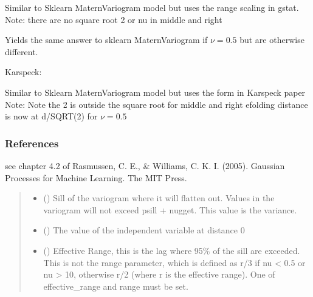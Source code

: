 \documentclass[letterpaper,10pt,english]{sphinxmanual}
\begin{document}
\begin{fulllineitems}
\sphinxAtStartPar
Similar to Sklearn MaternVariogram model but uses the range scaling in
gstat.
Note: there are no square root 2 or nu in middle and right

\sphinxAtStartPar
Yields the same answer to sklearn MaternVariogram if \(\nu=0.5\)
but are otherwise different.

\sphinxAtStartPar
Karspeck:

\sphinxAtStartPar
Similar to Sklearn MaternVariogram model but uses the form in Karspeck paper
Note: Note the 2 is outside the square root for middle and right
e\sphinxhyphen{}folding distance is now at d/SQRT(2) for \(\nu=0.5\)
\subsubsection*{References}

\sphinxAtStartPar
see chapter 4.2 of Rasmussen, C. E., \& Williams, C. K. I. (2005).
Gaussian Processes for Machine Learning. The MIT Press.
\begin{quote}\begin{description}
\begin{itemize}
\item {}
\sphinxAtStartPar
{} (\sphinxstyleliteralemphasis{\sphinxupquote{ | }}) \textendash{} Sill of the variogram where it will flatten out. Values in the variogram
will not exceed psill + nugget. This value is the variance.

\item {}
\sphinxAtStartPar
{} (\sphinxstyleliteralemphasis{\sphinxupquote{ | }}) \textendash{} The value of the independent variable at distance 0

\item {}
\sphinxAtStartPar
{} (\sphinxstyleliteralemphasis{\sphinxupquote{ | }}\sphinxstyleliteralemphasis{\sphinxupquote{ | }}) \textendash{} Effective Range, this is the lag where 95\% of the sill are exceeded.
This is not the range parameter, which is defined as r/3 if nu \textless{} 0.5 or
nu \textgreater{} 10, otherwise r/2 (where r is the effective range). One of
effective\_range and range must be set.


\end{itemize}
\end{description}
\end{quote}
\end{fulllineitems}
\end{document}

